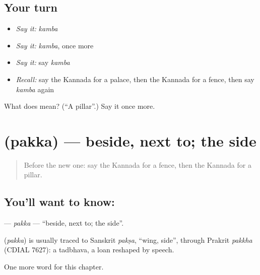 \subsection*{Your turn}
\begin{itemize}
\raggedright
  \item \emph{Say it:} \emph{kamba}
  \item \emph{Say it:} \emph{kamba}, once more
  \item \emph{Say it:} say \emph{kamba}
  \item \emph{Recall:} say the Kannada for a palace, then the Kannada for a fence, then say \emph{kamba} again
\end{itemize}

\begin{tcolorbox}[breakable,colback=teal!4,colframe=teal!35!black,title={Before you move on}]
What does  mean? (\textquotedblleft{}A pillar\textquotedblright{}.) Say it once more.
\end{tcolorbox}
\section[\texorpdfstring{\kn{ಪಕ್ಕ} (pakka)}{ಪಕ್ಕ (pakka)}]{ (pakka) — beside, next to; the side}

\label{lesson:KA-C175-pakka}



\begin{quote}
Before the new one: say the Kannada for a fence, then the Kannada for a pillar.
\end{quote}

\subsection*{You'll want to know: }
\textbf{} — \emph{pakka} — \textquotedblleft{}beside, next to; the side\textquotedblright{}.

\begin{cousinweb}
\textbf{} (\emph{pakka}) is usually traced to Sanskrit \emph{pakṣa}, \textquotedblleft{}wing, side\textquotedblright{}, through Prakrit \emph{pakkha} (CDIAL 7627): a tadbhava, a loan reshaped by speech.
\end{cousinweb}

\begin{grammarlens}[title={What you've built}]
One more word for this chapter.
\end{grammarlens}

